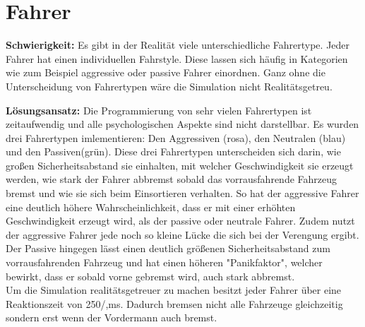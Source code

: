 \section{Fahrer}
\textbf{Schwierigkeit:} Es gibt in der Realität viele unterschiedliche Fahrertype. Jeder Fahrer hat einen individuellen Fahrstyle. Diese lassen sich häufig in Kategorien wie zum Beispiel aggressive oder passive Fahrer einordnen. Ganz ohne die Unterscheidung von Fahrertypen wäre die Simulation nicht Realitätsgetreu.
\begin{addmargin}[25pt]{0pt}
	\item \textbf{Lösungsansatz:} Die Programmierung von sehr vielen Fahrertypen ist zeitaufwendig und alle psychologischen Aspekte sind nicht darstellbar. Es wurden drei Fahrertypen imlementieren: Den Aggressiven (rosa), den Neutralen (blau) und den Passiven(grün). Diese drei Fahrertypen unterscheiden sich darin, wie großen Sicherheitsabstand sie einhalten, mit welcher Geschwindigkeit sie erzeugt werden, wie stark der Fahrer abbremst sobald das vorrausfahrende Fahrzeug bremst und wie sie sich beim Einsortieren verhalten. So hat der aggressive Fahrer eine deutlich höhere Wahrscheinlichkeit, dass er mit einer erhöhten Geschwindigkeit erzeugt wird, als der passive oder neutrale Fahrer. Zudem nutzt der aggressive Fahrer jede noch so kleine Lücke die sich bei der Verengung ergibt. Der Passive hingegen lässt einen deutlich größenen Sicherheitsabstand zum vorrausfahrenden Fahrzeug und hat einen höheren "Panikfaktor", welcher bewirkt, dass er sobald vorne gebremst wird, auch stark abbremst.\\
	Um die Simulation realitätsgetreuer zu machen besitzt jeder Fahrer über eine Reaktionszeit von 250/,ms. Dadurch bremsen nicht alle Fahrzeuge gleichzeitig sondern erst wenn der Vordermann auch bremst.\\
\end{addmargin}